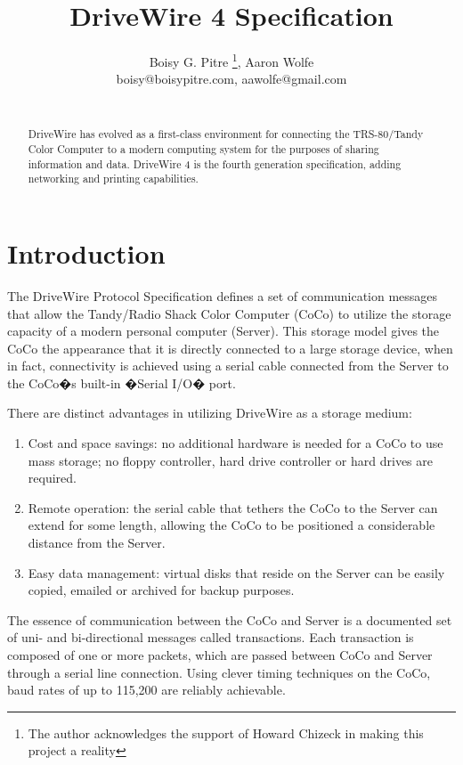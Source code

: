 \documentclass{article}
\title{DriveWire 4 Specification}
\author{Boisy G. Pitre
\thanks{The author acknowledges the support of Howard Chizeck in
making this project a reality},
Aaron Wolfe\\
{boisy@boisypitre.com, aawolfe@gmail.com}\\
\\
}
\begin{document}
\makecover
\maketitle

\begin{abstract}

DriveWire has evolved as a first-class environment for connecting the TRS-80/Tandy Color Computer to a modern computing system for the purposes of sharing information and data. DriveWire 4 is the fourth generation specification, adding networking and printing capabilities.

\end{abstract}


\section{Introduction} 

The DriveWire Protocol Specification defines a set of communication messages that allow the Tandy/Radio Shack Color Computer (CoCo) to utilize the storage capacity of a modern personal computer (Server). This storage model gives the CoCo the appearance that it is directly connected to a large storage device, when in fact, connectivity is achieved using a serial cable connected from the Server to the CoCo�s built-in �Serial I/O� port.

There are distinct advantages in utilizing DriveWire as a storage medium:

\begin{enumerate}
\item Cost and space savings: no additional hardware is needed for a CoCo to use mass storage; no floppy controller, hard drive controller or hard drives are required.

\item Remote operation: the serial cable that tethers the CoCo to the Server can extend for some length, allowing the CoCo to be positioned a considerable distance from the Server.

\item Easy data management: virtual disks that reside on the Server can be easily copied, emailed or archived for backup purposes.

\end{enumerate}

The essence of communication between the CoCo and Server is a documented set of uni- and bi-directional messages called transactions.	Each transaction is composed of one or more packets, which are passed between CoCo and Server through a serial line connection.	Using clever timing techniques on the CoCo, baud rates of up to 115,200 are reliably achievable.
\end{document}
